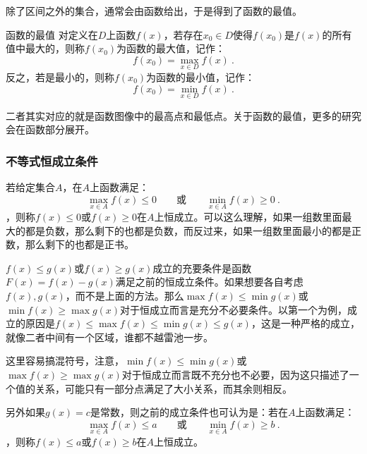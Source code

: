 除了区间之外的集合，通常会由函数给出，于是得到了函数的最值。

\begin{definition}{函数的最值}
对定义在$D$上函数$f(x)$，若存在$x_0\in D$使得$f(x_0)$是$f(x)$的所有值中最大的，则称$f(x_0)$为函数的最大值，记作：
\begin{equation}
f(x_0) = \max_{x \in D} f(x)~.
\end{equation}
反之，若是最小的，则称$f(x_0)$为函数的最小值，记作：
\begin{equation}
f(x_0) = \min_{x \in D} f(x)~.
\end{equation}
\end{definition}

二者其实对应的就是函数图像中的最高点和最低点。关于函数的最值，更多的研究会在函数部分展开。

\subsubsection{不等式恒成立条件}

若给定集合$A$，在$A$上函数满足：
\begin{equation}
\displaystyle\max_{x\in A} f(x)\leq 0\qquad\text{或}\qquad\min_{x\in A} f(x)\geq 0~.
\end{equation}
，则称$f(x)\leq 0$或$f(x)\geq 0$在$A$上恒成立。可以这么理解，如果一组数里面最大的都是负数，那么剩下的也都是负数，而反过来，如果一组数里面最小的都是正数，那么剩下的也都是正书。

$f(x)\leq g(x)$或$f(x)\geq g(x)$成立的充要条件是函数$F(x)=f(x)-g(x)$满足之前的恒成立条件。如果想要各自考虑$f(x),g(x)$，而不是上面的方法。那么$\max f(x)\leq\min g(x)$或$\min f(x)\geq\max g(x)$对于恒成立而言是充分不必要条件。以第一个为例，成立的原因是$f(x)\leq\max f(x)\leq\min g(x)\leq g(x)$，这是一种严格的成立，就像二者中间有一个区域，谁都不越雷池一步。

这里容易搞混符号，注意，$\min f(x)\leq\min g(x)$或$\max f(x)\geq\max g(x)$对于恒成立而言既不充分也不必要，因为这只描述了一个值的关系，可能只有一部分点满足了大小关系，而其余则相反。


另外如果$g(x)=c$是常数，则之前的成立条件也可认为是：若在$A$上函数满足：
\begin{equation}
\displaystyle\max_{x\in A} f(x)\leq a\qquad\text{或}\qquad\min_{x\in A} f(x)\geq b~.
\end{equation}
，则称$f(x)\leq a$或$f(x)\geq b$在$A$上恒成立。

